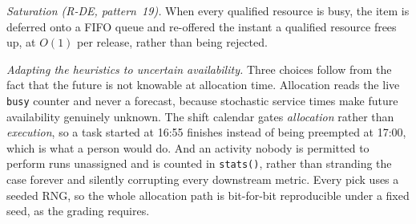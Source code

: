 \emph{Saturation (R-DE, pattern~19).} When every qualified resource is busy,
the item is deferred onto a FIFO queue and re-offered the instant a qualified
resource frees up, at $O(1)$ per release, rather than being rejected.

\emph{Adapting the heuristics to uncertain availability.} Three choices follow
from the fact that the future is not knowable at allocation time. Allocation
reads the live \texttt{busy} counter and never a forecast, because stochastic
service times make future availability genuinely unknown. The shift calendar
gates \emph{allocation} rather than \emph{execution}, so a task started at
16:55 finishes instead of being preempted at 17:00, which is what a person
would do. And an activity nobody is permitted to perform runs unassigned and is
counted in \texttt{stats()}, rather than stranding the case forever and
silently corrupting every downstream metric. Every pick uses a seeded RNG, so
the whole allocation path is bit-for-bit reproducible under a fixed seed, as
the grading requires.

